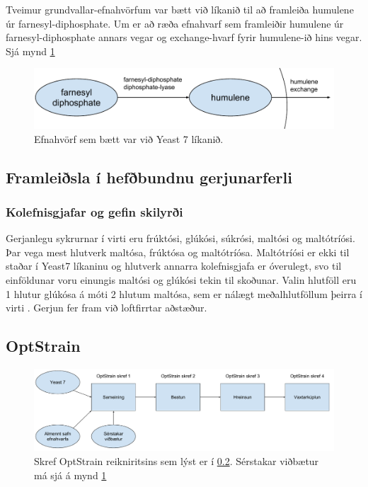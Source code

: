 \documentclass[12pt]{article}
\begin{document}
Tveimur grundvallar-efnahvörfum var bætt við líkanið til að framleiða humulene úr farnesyl-diphosphate.
Um er að ræða efnahvarf sem framleiðir humulene úr farnesyl-diphosphate annars vegar og exchange-hvarf fyrir humulene-ið hins vegar. Sjá mynd \ref{fig:pathway}

\begin{figure}
\caption[Viðbætur við Yeast 7]{Efnahvörf sem bætt var við Yeast 7 líkanið.}
\label{fig:pathway}
\includegraphics[width=\textwidth]{Pics/HumuleneAddition}
\end{figure}
\subsection{Framleiðsla í hefðbundnu gerjunarferli}
\label{sec:hefdbundid}
\subsubsection{Kolefnisgjafar og gefin skilyrði}
Gerjanlegu sykrurnar í virti eru frúktósi, glúkósi, súkrósi, maltósi og maltótríósi. Þar vega mest hlutverk maltósa, frúktósa og maltótríósa. Maltótríósi er ekki til staðar í Yeast7 líkaninu og hlutverk annarra kolefnisgjafa er óverulegt, svo til einföldunar voru einungis maltósi og glúkósi tekin til skoðunar. Valin hlutföll eru 1 hlutur glúkósa á móti 2 hlutum maltósa, sem er nálægt meðalhlutföllum þeirra í virti \cite{otter1967determination}. Gerjun fer fram við loftfirrtar aðstæður.
\subsection{OptStrain}
\label{sec:optstrain}
\begin{figure}
\caption[OptStrain reikniritið]{Skref OptStrain reikniritsins sem lýst er í \ref{sec:optstrain}. Sérstakar viðbætur má sjá á mynd \ref{fig:pathway}}
\label{fig:flaedirit}
\includegraphics[width=\textwidth]{Pics/OptStrainOverview}
\end{figure}
\end{document}
